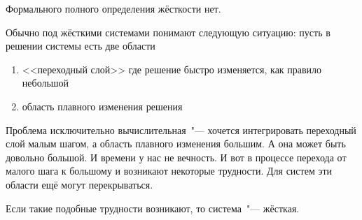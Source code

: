 \documentclass{trlnotes}
\begin{document}
\begin{defn}\label{def:ode::stiff}
  Формального полного определения жёсткости нет.  
\end{defn}
\begin{rem}
  Обычно под жёсткими системами понимают следующую ситуацию:
  пусть в решении системы есть две области
  \begin{enumerate}
    \item <<переходный слой>> где решение быстро изменяется, как правило небольшой
    \item область плавного изменения решения
  \end{enumerate}
  Проблема исключительно вычислительная~"--- хочется интегрировать переходный слой малым
  шагом, а область плавного изменения большим. А она может быть довольно большой.
  И времени у нас не вечность. И вот в процессе перехода от малого шага к большому и 
  возникают некоторые трудности. Для систем эти области ещё могут перекрываться.
  
  Если такие подобные трудности возникают, то система~"--- жёсткая.
\end{rem}
\end{document}
